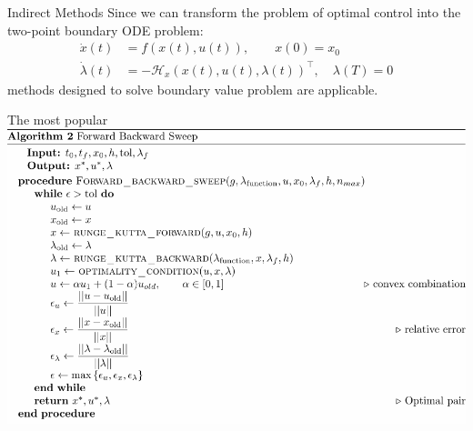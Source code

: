 \begin{frame}{Indirect Methods}
	Since we can transform the problem of optimal control into the two-point 
	boundary ODE problem:
	\begin{equation*}
		\label{eqn:extended_tpvbp}
		\begin{aligned}
			\dot{x}(t) &= 
				f(x(t), u(t)), \qquad x(0)=x_0 
			\\
			\dot{\lambda}(t) &=
				-\mathcal{H}_x(x(t),u(t),\lambda(t))^\top, \quad 
				\lambda(T)=0
		\end{aligned}
	\end{equation*}
	methods designed to solve boundary value problem are applicable.
\end{frame}
%
\begin{frame}{The most popular}
    \includegraphics[width=1\linewidth]{fbs_algorithm}
\end{frame}